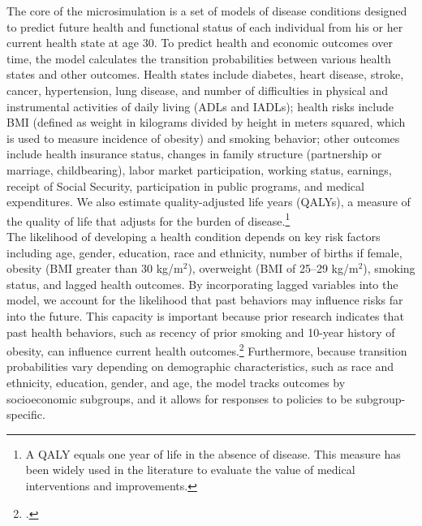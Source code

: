 \noindent The core of the microsimulation is a set of models of disease conditions designed to predict future health and functional status of each individual from his or her current health state at age 30. To predict health and economic outcomes over time, the model calculates the transition probabilities between various health states and other outcomes. Health states include diabetes, heart disease, stroke, cancer, hypertension, lung disease, and number of difficulties in physical and instrumental activities of daily living (ADLs and IADLs); health risks include BMI (defined as weight in kilograms divided by height in meters squared, which is used to measure incidence of obesity) and smoking behavior; other outcomes include health insurance status, changes in family structure (partnership or marriage, childbearing), labor market participation, working status, earnings, receipt of Social Security, participation in public programs, and medical expenditures. We also estimate quality-adjusted life years (QALYs), a measure of the quality of life that adjusts for the burden of disease.\footnote{A QALY equals one year of life in the absence of disease. This measure has been widely used in the literature to evaluate the value of medical interventions and improvements.} \\

\noindent The likelihood of developing a health condition depends on key risk factors including age, gender, education, race and ethnicity, number of births if female, obesity (BMI greater than 30 kg/m$^2$), overweight (BMI of 25--29 kg/m$^2$), smoking status, and lagged health outcomes. By incorporating lagged variables into the model, we account for the likelihood that past behaviors may influence risks far into the future. This capacity is important because prior research indicates that past health behaviors, such as recency of prior smoking and 10-year history of obesity, can influence current health outcomes.\footnote{\citet{Tong_etal_1996-Lung-Carcinoma,Moore_etal_2008_Past-Body-Mass}.} Furthermore, because transition probabilities vary depending on demographic characteristics, such as race and ethnicity, education, gender, and age, the model tracks outcomes by socioeconomic subgroups, and it allows for responses to policies to be subgroup-specific. \\

